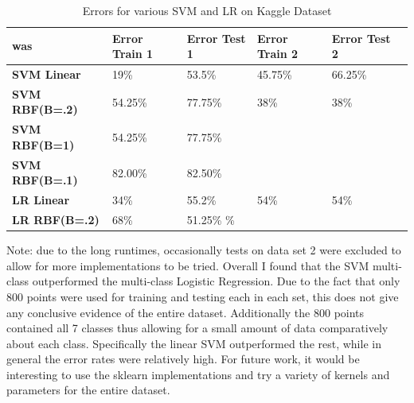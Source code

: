 \documentclass[pageno]{jpaper}
\begin{document}
\begin{table}[h!]
  \centering
  \begin{tabular}{llllll|}
    \hline
     \textbf{was } &\textbf{Error Train 1} & \textbf{Error Test 1} &\textbf{Error Train 2 }  & \textbf{Error Test 2}\\
    \hline
    \hline

  \textbf{SVM Linear} 	 & 19\%  &53.5\% &45.75\% &66.25\% &\\
 \hline
  \textbf{SVM RBF(B=.2)} 	 &54.25\% &77.75\% &38\% &38\%  \\
 \hline

   \textbf{SVM RBF(B=1)} 	&54.25\% &77.75\% & &   \\
 \hline
    \textbf{SVM RBF(B=.1)} 	&82.00\% &82.50\%  & &   \\
 \hline
 
   \textbf{LR Linear} 	 &34\% &55.2\% &54\%  & 54\% \\
 \hline
  \textbf{LR RBF(B=.2)} 	 &68\% &51.25\% \%  \\
 \hline


 \end{tabular}
  \caption{Errors for various SVM and LR on Kaggle Dataset}
  \label{table:formatting}
\end{table}
Note: due to the long runtimes, occasionally tests on data set 2 were excluded to allow for more implementations to be tried. 
Overall I found that the SVM multi-class outperformed the multi-class Logistic Regression. Due to the fact that only 800 points were used for training and testing each in each set, this does not give any conclusive evidence of the entire dataset. Additionally the 800 points contained all 7 classes thus allowing for a small amount of data comparatively about each class. Specifically the linear SVM outperformed the rest, while in general the error rates were relatively high. For future work, it would be interesting to use the sklearn implementations and try a variety of kernels and parameters for the entire dataset.
\end{document}
